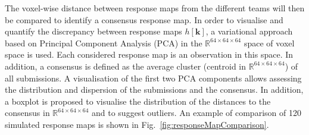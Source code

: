 \documentclass[fleqn,a4paper,oneside,openany]{book}
\begin{document}
The voxel-wise distance between response maps from the different teams will then be compared to identify a consensus response map. In order to visualise and quantify the discrepancy between response maps $h[\boldsymbol{k}]$, a variational approach based on Principal Component Analysis (PCA) in the $\mathbb{R}^{64\times64\times64}$ space of voxel space is used. Each considered response map is an observation in this space.
In addition, a consensus is defined as the average cluster (centroid in $\mathbb{R}^{64\times64\times64}$) of all submissions.
A visualisation of the first two PCA components allows assessing the distribution and dispersion of the submissions and the consensus. 
In addition, a boxplot is proposed to visualise the distribution of the  distances to the consensus in $\mathbb{R}^{64\times64\times64}$ and to suggest outliers.
An example of comparison of 120 simulated response maps is shown in Fig.~\ref{fig:responseMapComparison}.
\small
\end{document}
